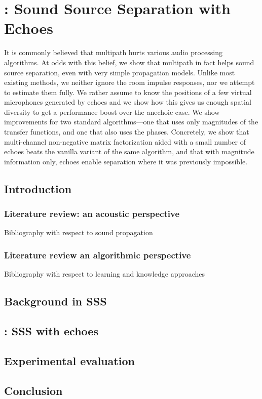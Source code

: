 \chapter{\separake: Sound Source Separation with Echoes}\label{chap:separake}

It is commonly believed that multipath hurts various audio processing algorithms.
At odds with this belief, we show that multipath in fact helps sound source separation,
even with very simple propagation models. Unlike most existing methods,
we neither ignore the room impulse responses, nor we attempt to estimate them fully.
We rather assume to know the positions of a few virtual microphones generated by
echoes and we show how this gives us enough spatial diversity to get a performance
boost over the anechoic case. We show improvements for two standard algorithms---one that
uses only magnitudes of the transfer functions, and one that also uses the phases.
Concretely, we show that multi-channel non-negative matrix factorization aided with
a small number of echoes beats the vanilla variant of the same algorithm,
and that with magnitude information only, echoes enable separation where it was previously impossible.

\section{Introduction}

\subsection{Literature review: an acoustic perspective}
Bibliography with respect to sound propagation

\subsection{Literature review an algorithmic perspective}
Bibliography with respect to learning and knowledge approaches

\section{Background in SSS}




\section{\separake: SSS with echoes}

\section{Experimental evaluation}

\section{Conclusion}